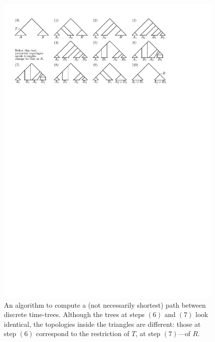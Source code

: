 \documentclass[11pt]{amsart}
\theoremstyle{definition}
\begin{document}
\begin{figure}
\centering
\includegraphics[width = \textwidth]{diameterUpperBound.pdf}
\caption{An algorithm to compute a (not necessarily shortest) path between discrete time-trees.
Although the trees at steps $(6)$ and $(7)$ look identical, the topologies inside the triangles are different: those at step $(6)$ correspond to the restriction of $T$, at step $(7)$---of $R$.}
\label{diameterUpperBound.pdf}
\end{figure}
\end{document}
